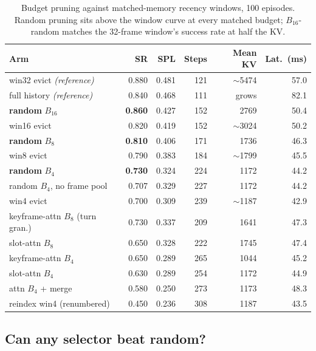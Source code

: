 \begin{table}[ht]
\centering
\begin{tabular}{lrrrrr}
\toprule
Arm & SR & SPL & Steps & Mean KV & Lat.\ (ms) \\
\midrule
win32 evict \emph{(reference)}      & 0.880 & 0.481 & 121 & $\sim$5474 & 57.0 \\
full history \emph{(reference)}     & 0.840 & 0.468 & 111 & grows      & 82.1 \\
\midrule
\textbf{random} $B_{16}$            & \textbf{0.860} & 0.427 & 152 & 2769 & 50.4 \\
win16 evict                         & 0.820 & 0.419 & 152 & $\sim$3024 & 50.2 \\
\textbf{random} $B_8$               & \textbf{0.810} & 0.406 & 171 & 1736 & 46.3 \\
win8 evict                          & 0.790 & 0.383 & 184 & $\sim$1799 & 45.5 \\
\textbf{random} $B_4$               & \textbf{0.730} & 0.324 & 224 & 1172 & 44.2 \\
random $B_4$, no frame pool         & 0.707 & 0.329 & 227 & 1172 & 44.2 \\
win4 evict                          & 0.700 & 0.309 & 239 & $\sim$1187 & 42.9 \\
\midrule
keyframe-attn $B_8$ (turn gran.)    & 0.730 & 0.337 & 209 & 1641 & 47.3 \\
slot-attn $B_8$                     & 0.650 & 0.328 & 222 & 1745 & 47.4 \\
keyframe-attn $B_4$                 & 0.650 & 0.289 & 265 & 1044 & 45.2 \\
slot-attn $B_4$                     & 0.630 & 0.289 & 254 & 1172 & 44.9 \\
attn $B_4$ + merge                  & 0.580 & 0.250 & 273 & 1173 & 48.3 \\
reindex win4 (renumbered)           & 0.450 & 0.236 & 308 & 1187 & 43.5 \\
\bottomrule
\end{tabular}
\caption{Budget pruning against matched-memory recency windows, 100 episodes. Random
pruning sits above the window curve at every matched budget; $B_{16}$-random matches the
32-frame window's success rate at half the KV.}
\label{tab:kvprune-budget}
\end{table}

\subsection{Can any selector beat random?}
\label{sec:kvprune-selectors}


